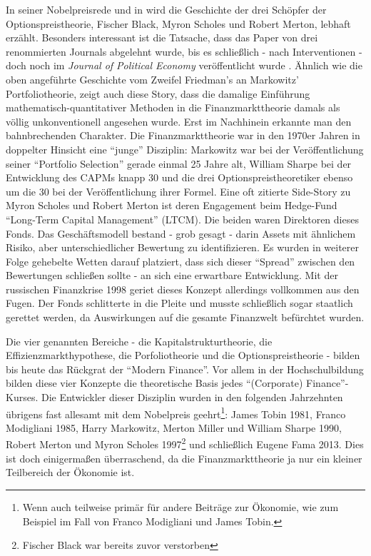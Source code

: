 In seiner Nobelpreisrede \parencite{Scholes1997} und in \textcite[S. 311]{Bernstein1996} wird die Geschichte der drei Schöpfer der Optionspreistheorie, Fischer Black, Myron Scholes und Robert Merton, lebhaft erzählt. Besonders interessant ist die Tatsache, dass das Paper \textcite{Black1973} von drei renommierten Journals abgelehnt wurde, bis es schließlich - nach Interventionen - doch noch im \textit{Journal of Political Economy} veröffentlicht wurde \parencite[S. 136]{Scholes1997}. Ähnlich wie die oben angeführte Geschichte vom Zweifel Friedman's an Markowitz' Portfoliotheorie, zeigt auch diese Story, dass die damalige Einführung mathematisch-quantitativer Methoden in die Finanzmarkttheorie damals als völlig unkonventionell angesehen wurde. Erst im Nachhinein erkannte man den bahnbrechenden Charakter. Die Finanzmarkttheorie war in den 1970er Jahren in doppelter Hinsicht eine "`junge"' Disziplin: Markowitz war bei der Veröffentlichung seiner "`Portfolio Selection"' gerade einmal 25 Jahre alt, William Sharpe bei der Entwicklung des CAPMs knapp 30 und die drei Optionspreistheoretiker ebenso um die 30 bei der Veröffentlichung ihrer Formel. Eine oft zitierte Side-Story zu Myron Scholes und Robert Merton ist deren Engagement beim Hedge-Fund "`Long-Term Capital Management"' (LTCM). Die beiden waren Direktoren dieses Fonds. Das Geschäftsmodell bestand - grob gesagt - darin Assets mit ähnlichem Risiko, aber unterschiedlicher Bewertung zu identifizieren. Es wurden in weiterer Folge gehebelte Wetten darauf platziert, dass sich dieser "`Spread"' zwischen den Bewertungen schließen sollte - an sich eine erwartbare Entwicklung. Mit der russischen Finanzkrise 1998 geriet dieses Konzept allerdings vollkommen aus den Fugen. Der Fonds schlitterte in die Pleite und musste schließlich sogar staatlich gerettet werden, da Auswirkungen auf die gesamte Finanzwelt befürchtet wurden.

Die vier genannten Bereiche - die Kapitalstrukturtheorie, die Effizienzmarkthypothese, die Porfoliotheorie und die Optionspreistheorie - bilden bis heute das Rückgrat der "`Modern Finance"'. Vor allem in der Hochschulbildung bilden diese vier Konzepte die theoretische Basis jedes "`(Corporate) Finance"'-Kurses. Die Entwickler dieser Disziplin wurden in den folgenden Jahrzehnten übrigens fast allesamt mit dem Nobelpreis geehrt\footnote{Wenn auch teilweise primär für andere Beiträge zur Ökonomie, wie zum Beispiel im Fall von Franco Modigliani und James Tobin.}: James Tobin 1981, Franco Modigliani 1985, Harry Markowitz, Merton Miller und William Sharpe 1990, Robert Merton und Myron Scholes 1997\footnote{Fischer Black war bereits zuvor verstorben} und schließlich Eugene Fama 2013. Dies ist doch einigermaßen überraschend, da die Finanzmarkttheorie ja nur ein kleiner Teilbereich der Ökonomie ist.





